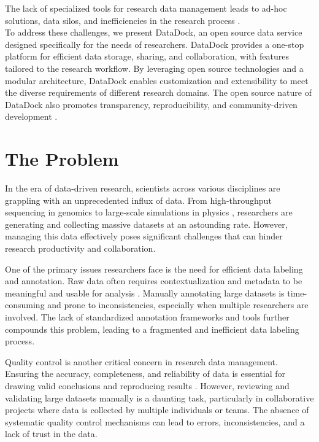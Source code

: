 \documentclass[conference]{IEEEtran}
\begin{document}
The lack of specialized tools for research data management leads to ad-hoc solutions, data silos, and inefficiencies in the research process \cite{wilkinson2016fair}.
\\
To address these challenges, we present DataDock, an open source data service designed specifically for the needs of researchers.
DataDock provides a one-stop platform for efficient data storage, sharing, and collaboration, with features tailored to the research workflow.
By leveraging open source technologies and a modular architecture, DataDock enables customization and extensibility to meet the diverse requirements of different research domains.
The open source nature of DataDock also promotes transparency, reproducibility, and community-driven development \cite{gezelter2015open}.

\section{The Problem}
In the era of data-driven research, scientists across various disciplines are grappling with an unprecedented influx of data. From high-throughput sequencing in genomics \cite{stephens2015big} to large-scale simulations in physics \cite{vogelsberger2014introducing}, researchers are generating and collecting massive datasets at an astounding rate. However, managing this data effectively poses significant challenges that can hinder research productivity and collaboration.

One of the primary issues researchers face is the need for efficient data labeling and annotation. Raw data often requires contextualization and metadata to be meaningful and usable for analysis \cite{wilkinson2016fair}. Manually annotating large datasets is time-consuming and prone to inconsistencies, especially when multiple researchers are involved. The lack of standardized annotation frameworks and tools further compounds this problem, leading to a fragmented and inefficient data labeling process.

Quality control is another critical concern in research data management. Ensuring the accuracy, completeness, and reliability of data is essential for drawing valid conclusions and reproducing results \cite{eisner2018data}. However, reviewing and validating large datasets manually is a daunting task, particularly in collaborative projects where data is collected by multiple individuals or teams. The absence of systematic quality control mechanisms can lead to errors, inconsistencies, and a lack of trust in the data.
\end{document}
